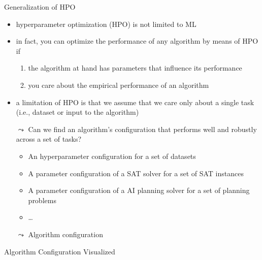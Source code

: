 \begin{frame}[c]{Generalization of HPO}

\begin{itemize}
	\item hyperparameter optimization (HPO) is not limited to ML
	\pause
	\item in fact, you can optimize the performance of any algorithm by means of HPO if
	\begin{enumerate}
		\pause
		\item the algorithm at hand has parameters that influence its performance
		\pause
		\item you care about the empirical performance of an algorithm
	\end{enumerate}
	\pause
	\smallskip
	\item a limitation of HPO is that we assume that we care only about a single task\\ (i.e., dataset or input to the algorithm)
	\smallskip
	\pause
	\item[$\leadsto$] \alert{Can we find an algorithm's configuration that performs well and robustly across a set of tasks?}
	\begin{itemize}
		\pause
		\item An hyperparameter configuration for a set of datasets
		\pause
		\item A parameter configuration of a SAT solver for a set of SAT instances
		\pause
		\item A parameter configuration of a AI planning solver for a set of planning problems
		\item \ldots
	\end{itemize}
	\pause
	\item[$\leadsto$] \alert{Algorithm configuration}
\end{itemize}


\end{frame}
\begin{frame}[c]{Algorithm Configuration Visualized}

\centering
{}

\end{frame}
